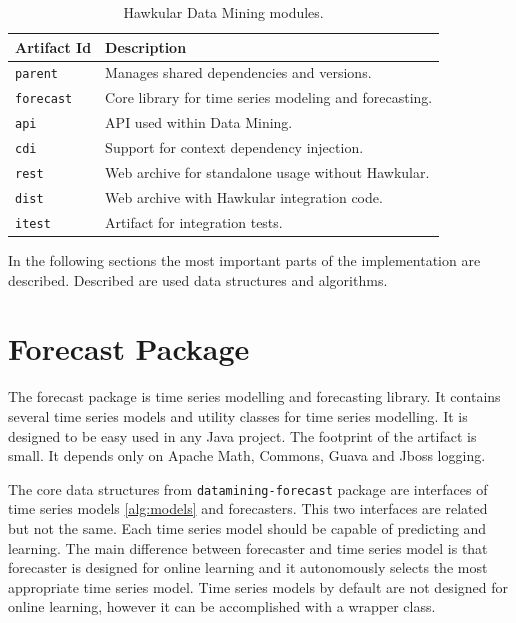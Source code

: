\begin{table}[h]
    \begin{center}
        \begin{tabular}{l|l}
            \textbf{Artifact Id} & \textbf{Description} \\ \hline \hline
            \texttt{parent} & Manages shared dependencies and versions. \\
            \texttt{forecast} & Core library for time series modeling and forecasting. \\
            \texttt{api} & API used within Data Mining. \\
            \texttt{cdi} & Support for context dependency injection. \\
            \texttt{rest} & Web archive for standalone usage without Hawkular. \\
            \texttt{dist} & Web archive with Hawkular integration code. \\
            \texttt{itest} & Artifact for integration tests.
        \end{tabular}
        \caption{Hawkular Data Mining modules.}
        \label{tab:datamining-modules}
    \end{center}
\end{table}

In the following sections the most important parts of the implementation are described. Described are used data
structures and algorithms.

    \section{Forecast Package}
    The forecast package is time series modelling and forecasting library. It contains several time series models
    and utility classes for time series modelling. It is designed to be easy used in any Java project. The footprint
    of the artifact is small. It depends only on Apache Math, Commons, Guava and Jboss logging.

    The core data structures from \texttt{datamining-forecast} package are interfaces of time series models
    \ref{alg:models} and forecasters. This two interfaces are related but not the same. Each time series model should
     be capable of
    predicting and learning. The main difference between forecaster and time series model is that forecaster
    is designed for online learning and it autonomously selects the most appropriate time series model. Time series
    models by default are not designed for online learning, however it can be accomplished with a wrapper class.

